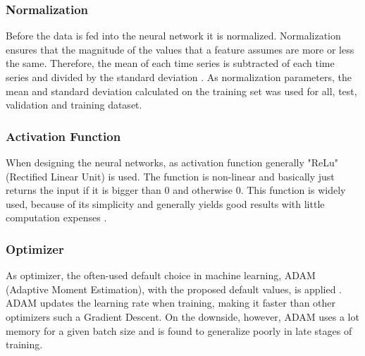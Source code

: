 \subsubsection{Normalization}
Before the data is fed into the neural network it is normalized. Normalization ensures that the magnitude of the values that a feature assumes are more or less the same. Therefore, the mean of each time series is subtracted of each time series and divided by the standard deviation \parencite{Stöttner2019}. As normalization parameters, the mean and standard deviation calculated on the training set was used for all, test, validation and training dataset.  

\subsubsection{Activation Function}
When designing the neural networks, as activation function generally "ReLu" (Rectified Linear Unit) is used. The function is non-linear and basically just returns the input if it is bigger than 0 and otherwise 0. This function is widely used, because of its simplicity and generally yields good results with little computation expenses \parencite{Brownlee2019.2}.  

\subsubsection{Optimizer}
As optimizer, the often-used default choice in machine learning, ADAM (Adaptive Moment Estimation), with the proposed default values, is applied \parencite{Katanforoosh2019}. ADAM updates the learning rate when training, making it faster than other optimizers such a Gradient Descent. On the downside, however, ADAM uses a lot memory for a given batch size and is found to generalize poorly in late stages of training.

